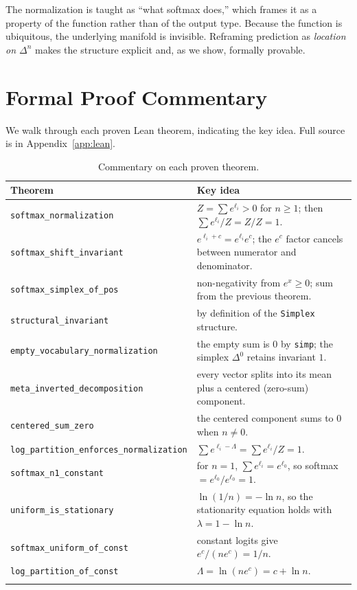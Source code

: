 \documentclass[11pt]{article}
\newcommand{\simplex}[1]{\Delta^{#1}}
\begin{document}
The normalization is taught as ``what softmax does,'' which frames it as a
property of the function rather than of the output type. Because the function is
ubiquitous, the underlying manifold is invisible. Reframing prediction as
\emph{location on $\simplex{n}$} makes the structure explicit and, as we show,
formally provable.

\section{Formal Proof Commentary}
\label{sec:proof-commentary}

We walk through each proven Lean theorem, indicating the key idea. Full source
is in Appendix~\ref{app:lean}.

\begin{longtable}{@{}p{5.2cm}p{9.5cm}@{}}
\toprule
Theorem & Key idea \\
\midrule
\texttt{softmax\_normalization} & $Z=\sum e^{\ell_i}>0$ for $n\ge 1$; then
$\sum e^{\ell_i}/Z = Z/Z = 1$. \\
\texttt{softmax\_shift\_invariant} & $e^{\ell_i+c}=e^{\ell_i}e^c$; the
$e^c$ factor cancels between numerator and denominator. \\
\texttt{softmax\_simplex\_of\_pos} & non-negativity from $e^x\ge 0$; sum from
the previous theorem. \\
\texttt{structural\_invariant} & by definition of the \texttt{Simplex}
structure. \\
\texttt{empty\_vocabulary\_normalization} & the empty sum is $0$ by
\texttt{simp}; the simplex $\simplex{0}$ retains invariant $1$. \\
\texttt{meta\_inverted\_decomposition} & every vector splits into its mean plus
a centered (zero-sum) component. \\
\texttt{centered\_sum\_zero} & the centered component sums to $0$ when
$n\neq 0$. \\
\texttt{log\_partition\_enforces\_normalization} & $\sum e^{\ell_i-\Lambda}
= \sum e^{\ell_i}/Z = 1$. \\
\texttt{softmax\_n1\_constant} & for $n=1$, $\sum e^{\ell_i}=e^{\ell_0}$, so
softmax $= e^{\ell_0}/e^{\ell_0}=1$. \\
\texttt{uniform\_is\_stationary} & $\ln(1/n)=-\ln n$, so the stationarity
equation holds with $\lambda=1-\ln n$. \\
\texttt{softmax\_uniform\_of\_const} & constant logits give
$e^c/(n e^c)=1/n$. \\
\texttt{log\_partition\_of\_const} & $\Lambda = \ln(n e^c)=c+\ln n$. \\
\bottomrule
\caption{Commentary on each proven theorem.}
\label{tab:commentary}
\end{longtable}
\end{document}
